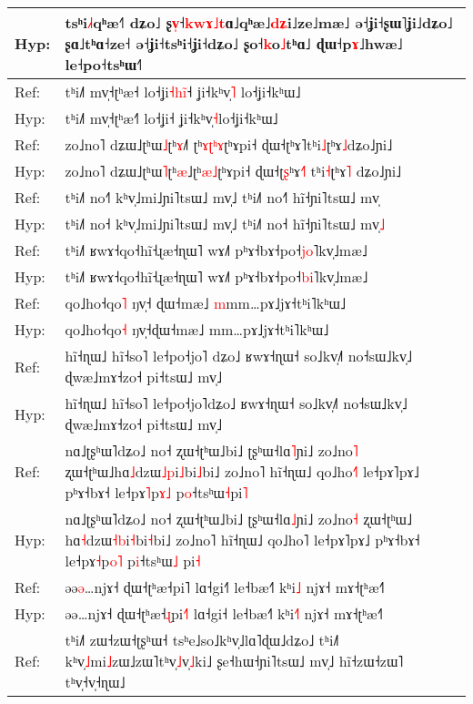 \documentclass[10pt]{article}
\DeclareRobustCommand{\hl}[1]{{\textcolor{red}{#1}}}
\begin{document}
\begin{longtable}{ll}
Hyp: & tsʰi\hl{˩}˧qʰæ˧˥ dʑo˩ ʂ\hl{v}\hl{̩}˧\hl{k}\hl{w}\hl{ɤ}\hl{˩}\hl{t}ɑ˩qʰæ˩\hl{d}\hl{ʑ}i˩ze˩mæ˩ ə˧ʝi˧ʂɯ˥ʝi˩dʑo˩ ʂɑ˩tʰɑ˧ze˧ ə˧ʝi˧tsʰi˧ʝi˧dʑo˩ ʂo˧\hl{k}o\hl{˩}tʰɑ˩ ɖɯ˧p\hl{ɤ}˩hwæ˩ le˧po˧tsʰɯ˧˥ \\ 
\midrule 
Ref: & tʰi˩˥ mv̩˧ʈʰæ˧ lo˧ʝi\hl{˧}\hl{h}\hl{i}\hl{̃}˧ ʝi˧kʰv̩\hl{˥}\hl{ }lo˧ʝi˧kʰɯ˩ \\ 
Hyp: & tʰi˩˥ mv̩˧ʈʰæ˧\hl{˥} lo˧ʝi˧ ʝi˧kʰv̩\hl{˧}lo˧ʝi˧kʰɯ˩ \\ 
\midrule 
Ref: & zo˩no˥ dʑɯ˩ʈʰɯ\hl{˩}ʈʰ\hl{ɤ}˩\hl{˥}\hl{ }ʈʰ\hl{ɤ}\hl{ʈ}\hl{ʰ}\hl{ɤ}ʈʰɤpi˧ ɖɯ˧ʈʰɤ˥tʰi\hl{˩}ʈʰɤ\hl{˩}dʑo˩ɲi˩ \\ 
Hyp: & zo˩no˥ dʑɯ˩ʈʰɯ\hl{˥}ʈʰ\hl{æ}˩ʈʰ\hl{æ}\hl{˩}ʈʰɤpi˧ ɖɯ˧ʈ\hl{ʂ}ʰɤ\hl{˧}˥\hl{ }tʰi\hl{˧}ʈʰɤ\hl{˥}\hl{ }dʑo˩ɲi˩ \\ 
\midrule 
Ref: & tʰi˩˥ no˧\hl{˥} kʰv̩˩mi˩ɲi˥tsɯ˩ mv̩˩ tʰi˩˥ no˧\hl{˥} hĩ˧ɲi˥tsɯ˩ mv̩ \\ 
Hyp: & tʰi˩˥ no˧ kʰv̩˩mi˩ɲi˥tsɯ˩ mv̩˩ tʰi˩˥ no˧ hĩ˧ɲi˥tsɯ˩ mv̩\hl{˩} \\ 
\midrule 
Ref: & tʰi˩˥ ʁwɤ˧qo˧hĩ˧ɻæ˧ɳɯ˥ wɤ˩˥ pʰɤ˧bɤ˧po˧\hl{j}\hl{o}˥kv̩˩mæ˩ \\ 
Hyp: & tʰi˩˥ ʁwɤ˧qo˧hĩ˧ɻæ˧ɳɯ˥ wɤ˩˥ pʰɤ˧bɤ˧po˧\hl{b}\hl{i}˥kv̩˩mæ˩ \\ 
\midrule 
Ref: & qo˩ho˧qo\hl{˥} ŋv̩˧\hl{ }ɖɯ˧mæ˩ \hl{m}mm…pɤ˩jɤ˧tʰi˥kʰɯ˩ \\ 
Hyp: & qo˩ho˧qo\hl{˧} ŋv̩˧ɖɯ˧mæ˩ mm…pɤ˩jɤ˧tʰi˥kʰɯ˩ \\ 
\midrule 
Ref: & hĩ˧ɳɯ˩ hĩ˧so˥ le˧po˧jo˥\hl{ }dʑo˩ ʁwɤ˧ɳɯ˧ so˩kv̩˩˥ no˧sɯ˩kv̩˩ ɖwæ˩mɤ˧zo˧ pi˧tsɯ˩ mv̩˩ \\ 
Hyp: & hĩ˧ɳɯ˩ hĩ˧so˥ le˧po˧jo˥dʑo˩ ʁwɤ˧ɳɯ˧ so˩kv̩˩˥ no˧sɯ˩kv̩˩ ɖwæ˩mɤ˧zo˧ pi˧tsɯ˩ mv̩˩ \\ 
\midrule 
Ref: & nɑ˩ʈʂʰɯ˥dʑo˩ no˧ ʐɯ˧ʈʰɯ˩bi˩ ʈʂʰɯ˧lɑ\hl{˥}ɲi˩ zo˩no\hl{˥} ʐɯ˧ʈʰɯ˩hɑ\hl{˩}dzɯ\hl{˩}\hl{p}i\hl{˩}bi\hl{˩}bi˩ zo˩no˥ hĩ˧ɳɯ˩ qo˩ho\hl{˧}˥ le˧pɤ˥pɤ˩ pʰɤ˧bɤ˧ le˧pɤ\hl{˥}p\hl{ɤ}\hl{˩} p\hl{o}˧tsʰɯ\hl{˧}pi\hl{˥} \\ 
Hyp: & nɑ˩ʈʂʰɯ˥dʑo˩ no˧ ʐɯ˧ʈʰɯ˩bi˩ ʈʂʰɯ˧lɑ\hl{˩}ɲi˩ zo˩no\hl{˧} ʐɯ˧ʈʰɯ˩\hl{ }hɑ\hl{˧}dzɯ\hl{˧}\hl{b}i\hl{˧}bi\hl{˧}bi˩ zo˩no˥ hĩ˧ɳɯ˩ qo˩ho˥ le˧pɤ˥pɤ˩ pʰɤ˧bɤ˧ le˧pɤ\hl{˧}p\hl{o}\hl{˥} p\hl{i}˧tsʰɯ\hl{˩}\hl{ }pi\hl{˧} \\ 
\midrule 
Ref: & əə\hl{ə}…njɤ˧ ɖɯ˧ʈʰæ˧pi˥ lɑ˧gi˧\hl{˥} le˧bæ˧˥ kʰi\hl{˩} njɤ˧ mɤ˧ʈʰæ˧˥ \\ 
Hyp: & əə…njɤ˧ ɖɯ˧ʈʰæ˧\hl{ɻ}pi\hl{˧}˥ lɑ˧gi˧ le˧bæ˧˥ kʰi\hl{˧}\hl{˥} njɤ˧ mɤ˧ʈʰæ˧˥ \\ 
\midrule 
Ref: & tʰi˩˥ zɯ˧zɯ˧ʈʂʰɯ˧ tsʰe˩so˩kʰv̩˩lɑ˥ɖɯ˩dʑo˩ tʰi˩˥ kʰv̩\hl{˩}mi\hl{˩}zɯ˩zɯ˥tʰv̩\hl{˩}v̩\hl{˩}ki˩ ʂe˧hɯ˧ɲi˥tsɯ˩ mv̩˩ hĩ˧zɯ˧zɯ˥ tʰv̩˧v̩˧ɳɯ˩ \\ 

\end{longtable}
\end{document}
